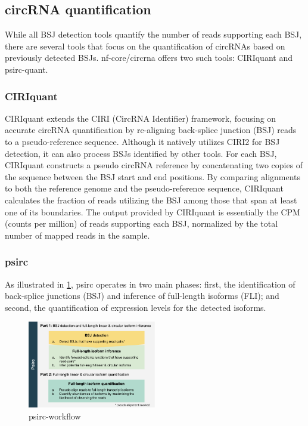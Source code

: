 \subsection{circRNA quantification}

While all BSJ detection tools quantify the number of reads supporting each BSJ,
there are several tools that focus on the quantification of circRNAs based on
previously detected BSJs.
nf-core/circrna offers two such tools: CIRIquant and
psirc-quant.

\subsubsection{CIRIquant}
\label{sec:ciriquant}
CIRIquant extends the CIRI (CircRNA Identifier) framework, focusing on accurate
circRNA quantification by re-aligning back-splice junction (BSJ) reads to a
pseudo-reference sequence.
Although it natively utilizes CIRI2 for BSJ detection, it can also process BSJs
identified by other tools\supercite{zhang_accurate_2020}.
For each BSJ, CIRIquant constructs a pseudo circRNA reference by concatenating
two copies of the sequence between the BSJ start and end positions.
By comparing alignments to both the reference genome and the pseudo-reference
sequence, CIRIquant calculates the fraction of reads utilizing the BSJ among
those that span at least one of its boundaries\supercite{zhang_accurate_2020}.
The output provided by CIRIquant is essentially the CPM (counts per million) of
reads supporting each BSJ, normalized by the total number of mapped reads in
the sample.

\subsubsection{psirc}
\label{sec:psirc}
As illustrated in \cref{fig:psirc_workflow}, psirc operates in two main phases:
first, the identification of back-splice junctions (BSJ) and inference of
full-length isoforms (FLI); and second, the quantification of expression levels
for the detected isoforms\supercite{yu_quantifying_2021}.

\begin{figure}[ht] \centering

    \includegraphics[width=0.5\textwidth]{chapters/3_materials_and_methods/figures/psirc_pipeline.png}
    \caption{psirc-workflow} \label{fig:psirc_workflow} \end{figure}

